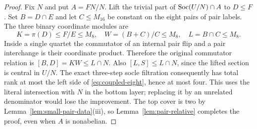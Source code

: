 \begin{proof}
Fix $N$ and put $A=FN/N$. Lift the trivial part of
$\operatorname{Soc}(U/N)\cap A$ to $D\leq F$. Set $B=D\cap E$ and let
$C\leq M_{16}$ be constant on the eight pairs of pair labels. The
three binary coordinate modules are
\[
 K=\pi(D)\leq F/E\leq M_8,\quad
 W=(B+C)/C\leq M_8,\quad L=B\cap C\leq M_8.
\]
Inside a single quartet the commutator of an internal pair flip and
a pair interchange is their coordinate product. Therefore the
original commutator relation is $[B,D]=KW\leq L\cap N$.
Also $[L,S]\leq L\cap N$, since the lifted section is central in
$U/N$. The exact three-step socle filtration consequently has total
rank at most the left side of \eqref{eq:coupled-eight}, hence at most
four. This uses the literal intersection with $N$ in the bottom
layer; replacing it by an unrelated denominator would lose the
improvement. The top cover is two by
Lemma~\ref{lem:small-pair-data}(iii), so
Lemma~\ref{lem:pair-relative} completes the proof, even when $A$ is
nonabelian.
\end{proof}

